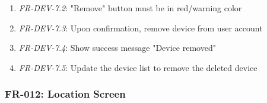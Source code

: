 \documentclass[conference]{IEEEtran}
\begin{document}
\begin{enumerate}
\begin{enumerate}
                            \item \textit{FR-DEV-7.2}: "Remove" button must be in red/warning color
                            \item \textit{FR-DEV-7.3}: Upon confirmation, remove device from user account
                            \item \textit{FR-DEV-7.4}: Show success message "Device removed"
                            \item \textit{FR-DEV-7.5}: Update the device list to remove the deleted device
                        \end{enumerate}
                \end{enumerate}
            \subsubsection{FR-012: Location Screen}
\end{document}
